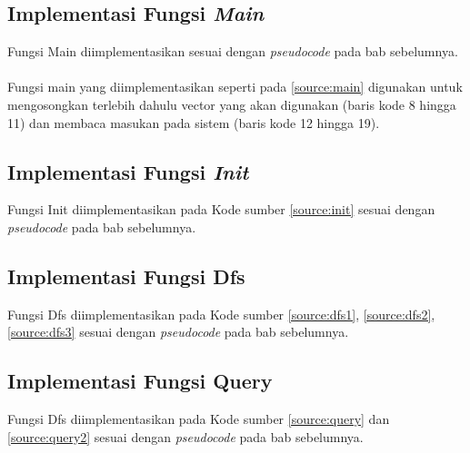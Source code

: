 	\subsection{\quad Implementasi Fungsi \textit{Main}}
	\quad Fungsi Main diimplementasikan sesuai dengan \textit{pseudocode} pada bab sebelumnya.\\\\
	
	Fungsi main yang diimplementasikan seperti pada \ref{source:main} digunakan untuk mengosongkan terlebih dahulu vector yang akan digunakan (baris kode 8 hingga 11) dan membaca masukan pada sistem (baris kode 12 hingga 19).\vspace{-0.5cm}
	\subsection{\quad Implementasi Fungsi \textit{Init}}
	\quad Fungsi Init diimplementasikan pada Kode sumber \ref{source:init} sesuai dengan \textit{pseudocode} pada bab sebelumnya.
	
	\subsection{\quad Implementasi Fungsi Dfs}
	\quad Fungsi Dfs diimplementasikan pada Kode sumber \ref{source:dfs1}, \ref{source:dfs2}, \ref{source:dfs3} sesuai dengan \textit{pseudocode} pada bab sebelumnya.
	
	
	\vspace{2cm}
	
	\subsection{\quad Implementasi Fungsi Query}
	\quad Fungsi Dfs diimplementasikan pada Kode sumber \ref{source:query} dan \ref{source:query2} sesuai dengan \textit{pseudocode} pada bab sebelumnya.
	
	
	\vspace{-0.5cm}
